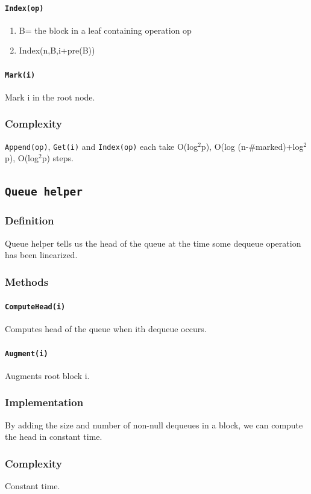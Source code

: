 \documentclass[12pt]{article}
\begin{document}
\paragraph{\texttt{Index(op)}}
\begin{enumerate}
  \item B= the block in a leaf containing operation op
  \item Index(n,B,i+pre(B))
\end{enumerate}
\paragraph{\texttt{Mark(i)}} Mark i in the root node.
\subsubsection{Complexity}
\texttt{Append(op)}, \texttt{Get(i)} and \texttt{Index(op)} each take O(log$^{2}$p),
O(log (n-\#marked)+log$^{2}$p),
O(log$^{2}$p) steps.


\subsection{\texttt{Queue helper}}
\subsubsection{Definition}
Queue helper tells us the head of the queue at the time some dequeue operation has been linearized.
\subsubsection{Methods}
\paragraph{\texttt{ComputeHead(i)}} Computes head of the queue when ith dequeue occurs.
\paragraph{\texttt{Augment(i)}} Augments root block i.
\subsubsection{Implementation}
By adding the size and number of non-null dequeues in a block, we can compute the head in constant time.
\subsubsection{Complexity}
Constant time.
\end{document}
